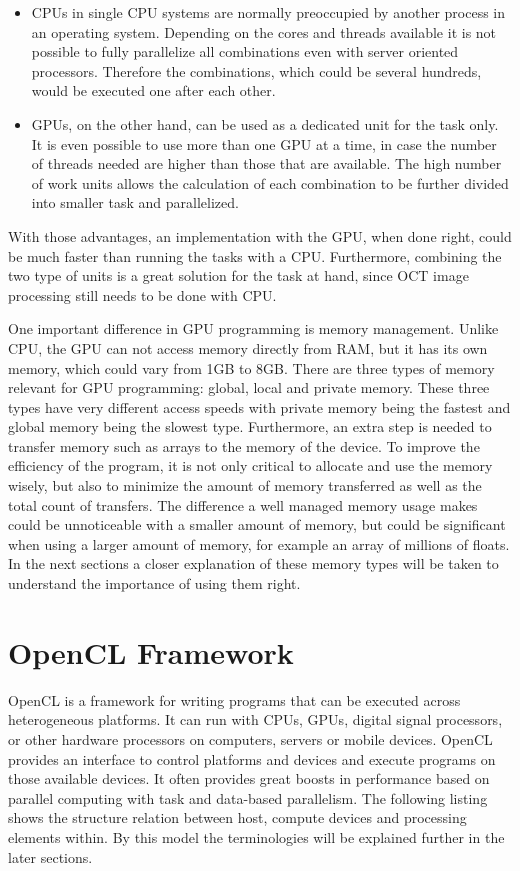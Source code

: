 \begin{itemize}
	\item CPUs in single CPU systems are normally preoccupied by another process in an operating system. Depending on the cores and threads available it is not possible to fully parallelize all combinations even with server oriented processors. Therefore the combinations, which could be several hundreds, would be executed one after each other.

	\item GPUs, on the other hand, can be used as a dedicated unit for the task only. It is even possible to use more than one GPU at a time, in case the number of threads needed are higher than those that are available. The high number of work units allows the calculation of each combination to be further divided into smaller task and parallelized.
\end{itemize} 

With those advantages, an implementation with the GPU, when done right, could be much faster than running the tasks with a CPU. Furthermore, combining the two type of units is a great solution for the task at hand, since OCT image processing still needs to be done with CPU. 

One important difference in GPU programming is memory management. Unlike CPU, the GPU can not access memory directly from RAM, but it has its own memory, which could vary from 1GB to 8GB. There are three types of memory relevant for GPU programming: global, local and private memory. These three types have very different access speeds with private memory being the fastest and global memory being the slowest type. Furthermore, an extra step is needed to transfer memory such as arrays to the memory of the device. To improve the efficiency of the program, it is not only critical to allocate and use the memory wisely, but also to minimize the amount of memory transferred as well as the total count of transfers. The difference a well managed memory usage makes could be unnoticeable with a smaller amount of memory, but could be significant when using a larger amount of memory, for example an array of millions of floats. In the next sections a closer explanation of these memory types will be taken to understand the importance of using them right.
\pagebreak
\section{OpenCL Framework}
OpenCL is a framework for writing programs that can be executed across heterogeneous platforms. It can run with CPUs, GPUs, digital signal processors, or other hardware processors on computers, servers or mobile devices. OpenCL provides an interface to control platforms and devices and execute programs on those available devices. It often provides great boosts in performance based on parallel computing with task and data-based parallelism. The following listing shows the structure relation between host, compute devices and processing elements within. By this model the terminologies will be explained further in the later sections.
 

